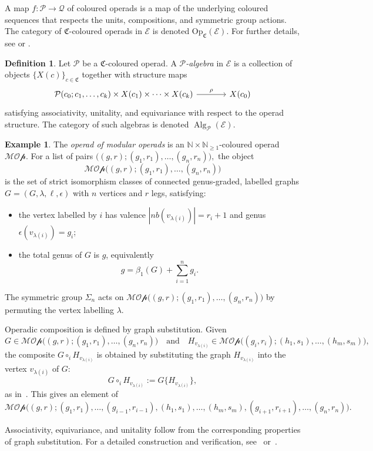 \documentclass{amsart}
\newcommand{\bE}{\mathscr{E}}
\newcommand{\Op}{\mathrm{Op}}
\newcommand{\Alg}{\operatorname{Alg}}
\newcommand{\nb}{nb}
\theoremstyle{definition}
\newtheorem{definition}[theorem]{Definition}%
\newtheorem{example}[theorem]{Example}%
\numberwithin{equation}{section}
\begin{document}
A map $f:\mathcal{P}\to\mathcal{Q}$ of coloured operads is a map of the underlying coloured sequences that respects the units, compositions, and symmetric group actions. The category of $\mathfrak{C}$-coloured operads in $\bE$ is denoted $\Op_{\mathfrak{C}}(\bE)$. For further details, see \cite[Definition~1.1]{bm_resolutions} or \cite[§2.2]{DCH}.

\begin{definition}
Let $\mathcal{P}$ be a $\mathfrak{C}$-coloured operad. A \emph{$\mathcal{P}$-algebra} in $\bE$ is a collection of objects $\{X(c)\}_{c\in\mathfrak{C}}$ together with structure maps
\[
\begin{tikzcd}[column sep=large] \mathcal{P}(c_0;c_1,\ldots,c_k)\times X(c_1)\times\cdots\times X(c_k) \arrow[r,"\rho"] & X(c_0) \end{tikzcd}
\]
satisfying associativity, unitality, and equivariance with respect to the operad structure. The category of such algebras is denoted $\Alg_{\mathcal{P}}(\bE)$.
\end{definition}

\begin{example}\label{def: operad for modular operads}
The \emph{operad of modular operads} is an $\mathbb{N}\times\mathbb{N}_{\ge 1}$-coloured operad $\mathcal{MOp}$. For a list of pairs $\bigl((g,r);(g_1,r_1),\ldots,(g_n,r_n)\bigr),$ the object
\[
\mathcal{MOp}\bigl((g,r);(g_1,r_1),\ldots,(g_n,r_n)\bigr)
\]
is the set of strict isomorphism classes of connected genus-graded, labelled graphs $G=(G,\lambda,\ell,\epsilon)$ with $n$ vertices and $r$ legs, satisfying:
\begin{itemize}
    \item the vertex labelled by $i$ has valence $|\nb(v_{\lambda(i)})|=r_i+1$ and genus $\epsilon(v_{\lambda(i)})=g_i$; 
    \item the total genus of $G$ is $g$, equivalently
    \[
    g=\beta_1(G)+\sum_{i=1}^n g_i.
    \]
\end{itemize}

The symmetric group $\Sigma_n$ acts on $\mathcal{MOp}\bigl((g,r);(g_1,r_1),\ldots,(g_n,r_n)\bigr)$ by permuting the vertex labelling $\lambda$.

\smallskip
Operadic composition is defined by graph substitution. Given
\[
G\in \mathcal{MOp}\bigl((g,r);(g_1,r_1),\ldots,(g_n,r_n)\bigr) \quad \text{and} \quad  H_{v_{\lambda(i)}}\in \mathcal{MOp}\bigl((g_i,r_i);(h_1,s_1),\ldots,(h_m,s_m)\bigr),
\]
the composite $G\circ_i H_{v_{\lambda(i)}}$ is obtained by substituting the
graph $H_{v_{\lambda(i)}}$ into the vertex $v_{\lambda(i)}$ of $G$:
\[
G\circ_i H_{v_{\lambda(i)}}:=G\{H_{v_{\lambda(i)}}\},
\]
as in~\cite[Construction~1.18]{hry1}. This gives an element of
\[
\mathcal{MOp}\bigl((g,r);
(g_1,r_1),\ldots,(g_{i-1},r_{i-1}),
(h_1,s_1),\ldots,(h_m,s_m),
(g_{i+1},r_{i+1}),\ldots,(g_n,r_n)\bigr).
\]

Associativity, equivariance, and unitality follow from the corresponding properties of graph substitution. For a detailed construction and verification, see~\cite[Appendix~A]{dch_coextension} or~\cite[§13.4]{yau_modular}.
\end{example}
\end{document}
